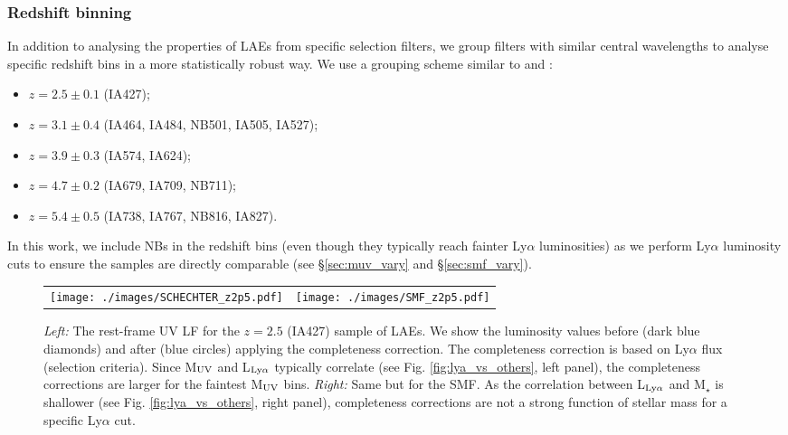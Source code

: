 \documentclass[a4paper,fleqn,usenatbib]{mnras}
\begin{document}
\subsubsection{Redshift binning} \label{subsec:binning}

In addition to analysing the properties of LAEs from specific selection filters, we group filters with similar central wavelengths to analyse specific redshift bins in a more statistically robust way. We use a grouping scheme similar to \cite{Sobral2018} and \cite{Santos2020}:
\begin{itemize}
\item $z=2.5\pm0.1$ (IA427);
\item $z=3.1\pm0.4$ (IA464, IA484, NB501, IA505, IA527);
\item $z=3.9\pm0.3$ (IA574, IA624);
\item $z=4.7\pm0.2$ (IA679, IA709, NB711);
\item $z=5.4\pm0.5$ (IA738, IA767, NB816, IA827).
\end{itemize}

In this work, we include NBs in the redshift bins (even though they typically reach fainter Ly$\alpha$ luminosities) as we perform Ly$\alpha$ luminosity cuts to ensure the samples are directly comparable (see \S\ref{sec:muv_vary} and \S\ref{sec:smf_vary}).

%
%
\begin{figure*}
\begin{tabular}{ll}
  \centering
  \texttt{[image: ./images/SCHECHTER\_z2p5.pdf]}
  &
  \texttt{[image: ./images/SMF\_z2p5.pdf]}  
\end{tabular}
  \caption{{\it Left:} The rest-frame UV LF for the $z=2.5$ (IA427) sample of LAEs. We show the luminosity values before (dark blue diamonds) and after (blue circles) applying the completeness correction. The completeness correction is based on Ly$\alpha$ flux (selection criteria). Since M$_{\rm UV}$ and L$_{\rm Ly\alpha}$ typically correlate (see Fig. \ref{fig:lya_vs_others}, left panel), the completeness corrections are larger for the faintest M$_{\rm UV}$ bins. {\it Right:} Same but for the SMF. As the correlation between L$_{\rm Ly\alpha}$ and M$_\star$ is shallower (see Fig. \ref{fig:lya_vs_others}, right panel), completeness corrections are not a strong function of stellar mass for a specific Ly$\alpha$ cut.}
  \label{fig:completeness}
\end{figure*}
\end{document}
